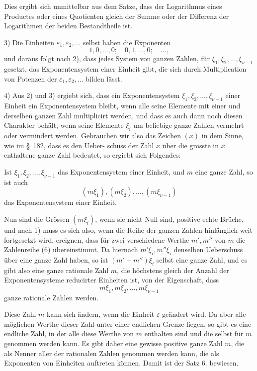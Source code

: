 \documentclass[11pt]{article}
\begin{document}
Dies ergibt sich unmittelbar aus dem Satze, dass der Logarithmus eines Productes oder eines Quotienten gleich der Summe oder der Differenz der Logarithmen der beiden Bestandtheile ist.

3) Die Einheiten $\varepsilon_1,\varepsilon_2,\ldots$ selbst haben die Exponenten
\[
1,0,\ldots,0;\quad 0,1,\ldots,0;\quad\ldots,
\]
und daraus folgt nach 2), dass jedes System von ganzen Zahlen, für $\xi_1,\xi_2,\ldots,\xi_{\nu-1}$ gesetzt, das Exponentensystem einer Einheit gibt, die sich durch Multiplication von Potenzen der $\varepsilon_1,\varepsilon_2,\ldots$ bilden lässt.

4) Aus 2) und 3) ergiebt sich, dass ein Exponentensystem $\xi_1,\xi_2,\ldots,\xi_{\nu-1}$ einer Einheit ein Exponentensystem bleibt, wenn alle seine Elemente mit einer und derselben ganzen Zahl multiplicirt werden, und dass es auch dann noch diesen Charakter behält, wenn seine Elemente $\xi_i$ um beliebige ganze Zahlen vermehrt oder vermindert werden. Gebrauchen wir also das Zeichen $(x)$ in dem Sinne, wie im \S~182, dass es den Ueber-
schuss der Zahl $x$ über die grösste in $x$ enthaltene ganze Zahl bedeutet, so ergiebt sich Folgendes:

Ist $\xi_1,\xi_2,\ldots,\xi_{\nu-1}$ das Exponentensystem einer Einheit, und $m$ eine ganze Zahl, so ist auch
\begin{equation}
(m\xi_1),(m\xi_2),\ldots,(m\xi_{\nu-1})
\tag{6}
\end{equation}
das Exponentensystem einer Einheit.

Nun sind die Grössen $(m\xi_i)$, wenn sie nicht Null sind, positive echte Brüche, und nach 1) muss es sich also, wenn die Reihe der ganzen Zahlen hinlänglich weit fortgesetzt wird, ereignen, dass für zwei verschiedene Werthe $m',m''$ von $m$ die Zahlenreihe (6) übereinstimmt. Da hiernach $m'\xi_i,m''\xi_i$ denselben Ueberschuss über eine ganze Zahl haben, so ist $(m'-m'')\xi_i$ selbst eine ganze Zahl, und es gibt also eine ganze rationale Zahl $m$, die höchstens gleich der Anzahl der Exponentensysteme reducirter Einheiten ist, von der Eigenschaft, dass
\[
m\xi_1,m\xi_2,\ldots,m\xi_{\nu-1}
\]
ganze rationale Zahlen werden.

Diese Zahl $m$ kann sich ändern, wenn die Einheit $\varepsilon$ geändert wird. Da aber alle möglichen Werthe dieser Zahl unter einer endlichen Grenze liegen, so gibt es eine endliche Zahl, in der alle diese Werthe von $m$ enthalten sind und die selbst für $m$ genommen werden kann. Es gibt daher eine gewisse positive ganze Zahl $m$, die als Nenner aller der rationalen Zahlen genommen werden kann, die als Exponenten von Einheiten auftreten können. Damit ist der Satz 6. bewiesen.
\end{document}
